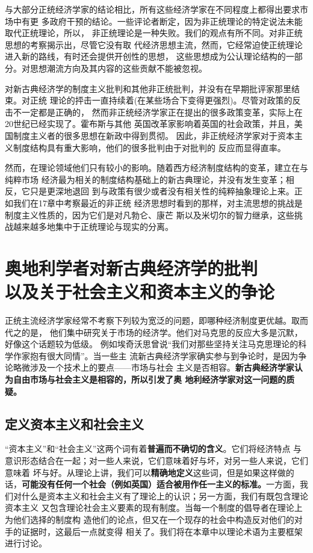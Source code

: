 与大部分正统经济学家的结论相比，所有这些经济学家在不同程度上都得出要求市场中有更
多政府干预的结论。一些评论者断定，因为非正统理论的特定说法未能取代正统理论，所以，
非正统理论是一种失败。我们的观点有所不同。对非正统思想的考察揭示出，尽管它没有取
代经济思想主流，然而，它经常迫使正统理论进入新的路线，有时还会提供开创性的思想，
这些思想成为公认理论结构的一部分。对思想潮流方向及其内容的这些贡献不能被忽视。

对新古典经济学的制度主义批判和其他非正统批判，并没有在早期批评家那里结束。对正统
理论的抨击一直持续着(在某些场合下变得更强烈)。尽管对政策的反击不一定都是正确的，
然而非正统经济学家正在提出的很多政策变革，实际上在20世纪已经实现了。霍布斯与其他
英国改革家影响着英国的社会政策，并且，美国制度主义者的很多思想在新政中得到贯彻。
因此，非正统经济学家对于资本主义制度结构具有重大影响，他们的很多批判由于对批判的
反应而显得直率。

然而，在理论领域他们只有较小的影响。随着西方经济制度结构的变革，建立在与纯粹市场
经济最为相关的制度结构基础上的新古典理论，并没有发生变革；相反，它只是更深地退回
到与政策有很少或者没有相关性的纯粹抽象理论上来。正如我们在17章中考察最近的非正统
经济思想时看到的那样，对主流思想的挑战是制度主义性质的，因为它们是对凡勃仑、康芒
斯以及米切尔的智力继承，这些挑战越来越多地集中于正统理论与现实的分离。

\chapter{奥地利学者对新古典经济学的批判\\以及关于社会主义和资本主义的争论}


正统主流经济学家经常不考察下列较为宽泛的问题，即哪种经济制度更优越。取而代之的是，
他们集中研究关于市场的经济学。他们对马克思的反应大多是沉默，好像这个话题较为低级。
例如埃奇沃思曾说“我们对那些坚持关注马克思理论的科学作家抱有很大同情”。当一些主
流新古典经济学家确实参与到争论时，是因为争论略微涉及一个技术上的要点——市场与社会
主义是否相容。\textbf{新古典经济学家认为自由市场与社会主义是相容的，所以引发了奥
  地利经济学家对这一问题的质疑。}

\section{定义资本主义和社会主义}

“资本主义”和“社会主义”这两个词有着\textbf{普遍而不确切的含义}。它们将经济特点
与意识形态结合在一起；对一些人来说，它们意味着好与坏，对另一些人来说，它们意味着
坏与好。从理论上讲，我们可以\textbf{精确地定义}这些词，但是如果这样做的
话，\textbf{可能没有任何一个社会（例如英国）适合被用作任一主义的标准。}一方面，我
们对什么是资本主义和社会主义有了理论上的认识；另一方面，我们有既包含理论资本主义
又包含理论社会主义要素的现有制度。当每一个制度的倡导者在理论上为他们选择的制度构
造他们的论点，但又在一个现存的社会中构造反对他们的对手的证据时，这最后一点就变得
相关了。我们将在本章中以理论术语为主要框架进行讨论。


